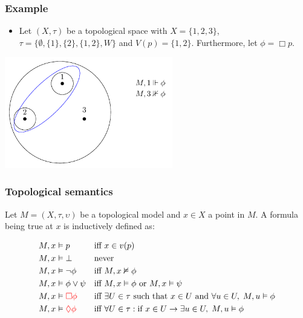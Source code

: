\documentclass[hyperref={pdfpagelabels=false},t,10pt]{beamer}
\begin{document}
  \begin{frame}
  
    \frametitle{Example}
    \begin{itemize}
      \item  Let $(X,\tau)$ be a topological space with 
      $X = \{1,2,3\}$, $\tau = \{\emptyset, \{1\}, \{2\}, \{1,2\}, W\}$ and $V(p) = \{1,2\}$. Furthermore, let $\phi = \Box p$.
      \pause
    \end{itemize}
    \centering
    \includegraphics[width=0.55\textwidth]{Example2.pdf}

  \end{frame}


\begin{frame}
  \frametitle{Topological semantics}
  Let $M = (X, \tau, \upsilon)$ be a topological model and $x \in X$ a point in $M$. A formula being true at $x$ is inductively defined as:

  \[
\begin{aligned}
    M, x &\vDash p &&\text{iff } x \in v(p) \\
    M, x &\vDash \bot &&\text{never} \\
    M, x &\vDash \neg \phi &&\text{iff } M, x \nvDash \phi \\
    M, x &\vDash \phi \lor \psi &&\text{iff } M, x \vDash \phi \text{ or } M, x \vDash \psi \\
    M, x &\vDash \textcolor{red}{\Box \phi} &&\text{iff }\exists U \in \tau \text{ such that } x \in U \text{ and } \forall u \in U,\; M, u \vDash \phi \\
    M, x &\vDash \textcolor{red}{\lozenge \phi} &&\text{iff }\forall U \in \tau: \text{if }x \in U \rightarrow \exists u \in U,\; M, u \vDash \phi
\end{aligned}
\]

\end{frame}
\end{document}
